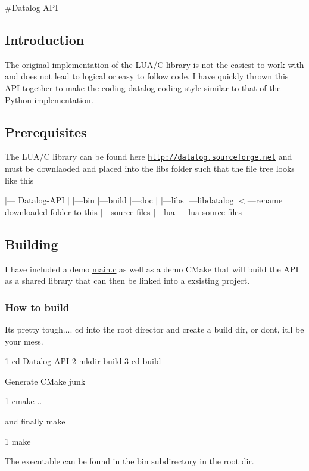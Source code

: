 \#\+Datalog A\+PI

\subsection*{Introduction}

The original implementation of the L\+U\+A/C library is not the easiest to work with and does not lead to logical or easy to follow code. I have quickly thrown this A\+PI together to make the coding datalog coding style similar to that of the Python implementation.

\subsection*{Prerequisites}

The L\+U\+A/C library can be found here \href{http://datalog.sourceforge.net}{\tt http\+://datalog.\+sourceforge.\+net} and must be downlaoded and placed into the libs folder such that the file tree looks like this

$\vert$--- Datalog-\/\+A\+PI $\vert$ $\vert$---bin $\vert$---build $\vert$---doc $\vert$ $\vert$---libs $\vert$---libdatalog $<$---rename downloaded folder to this $\vert$---source files $\vert$---lua $\vert$---lua source files

\subsection*{Building}

I have included a demo \hyperlink{main_8c}{main.\+c} as well as a demo C\+Make that will build the A\+PI as a shared library that can then be linked into a exsisting project.

\subsubsection*{How to build}

It\textquotesingle{}s pretty tough.... cd into the root director and create a build dir, or don\textquotesingle{}t, it\textquotesingle{}ll be your mess.


\begin{DoxyCode}
1 cd Datalog-API
2 mkdir build
3 cd build
\end{DoxyCode}
 Generate C\+Make junk 
\begin{DoxyCode}
1 cmake ..
\end{DoxyCode}
 and finally make 
\begin{DoxyCode}
1 make
\end{DoxyCode}
 The executable can be found in the bin subdirectory in the root dir.

